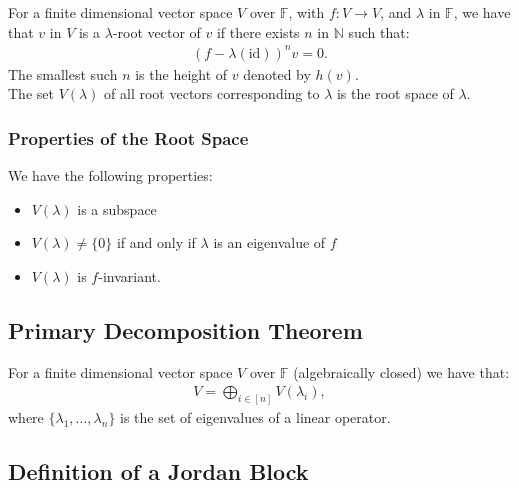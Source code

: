 \documentclass[a4paper, 12pt, twoside]{article}
\begin{document}
For a finite dimensional vector space $V$ over $\mathbb{F}$, with $f : V \to V$, 
and $\lambda$ in $\mathbb{F}$,
we have that $v$ in $V$ is a $\lambda$-root vector of $v$ if
there exists $n$ in $\mathbb{N}$ such that: \begin{gather*}
  (f - \lambda(\text{id}))^n v = 0.
\end{gather*} The smallest such $n$ is the height of $v$ denoted by $h(v)$.
\\[\baselineskip]
The set $V(\lambda)$ of all root vectors corresponding to $\lambda$ 
is the root space of $\lambda$.

\subsubsection{Properties of the Root Space}

We have the following properties: \begin{itemize}
  \item $V(\lambda)$ is a subspace
  \item $V(\lambda) \neq \{0\}$ if and only if $\lambda$ is an eigenvalue of $f$
  \item $V(\lambda)$ is $f$-invariant.
\end{itemize}

\subsection{Primary Decomposition Theorem}

For a finite dimensional vector space $V$ over $\mathbb{F}$ (algebraically closed) we have
that: \begin{gather*}
  V = \bigoplus_{i \in [n]} V(\lambda_i),
\end{gather*} where $\{\lambda_1, \ldots, \lambda_n\}$ is the set of eigenvalues of a
linear operator.

\subsection{Definition of a Jordan Block}
\end{document}
